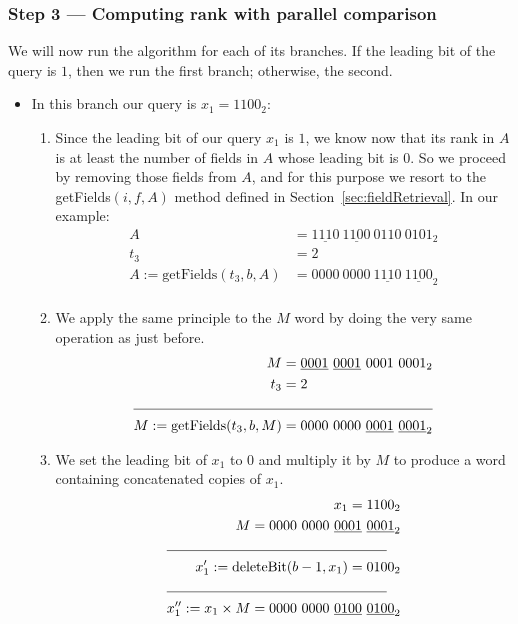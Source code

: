 \subsubsection{Step 3 --- Computing rank with parallel comparison}

We will now run the algorithm for each of its branches. If the leading bit of the query is $1$, then we run the first branch; otherwise, the second.
\begin{itemize}
    \item
    In this branch our query is $x_1 = 1100_2$:
    \begin{enumerate}
        \item
        Since the leading bit of our query $x_1$ is $1$, we know now that its rank in $A$ is at least the number of fields in $A$ whose leading bit is $0$. So we proceed by removing those fields from $A$, and for this purpose we resort to the getFields$(i, f, A)$ method defined in Section~\ref{sec:fieldRetrieval}. In our example:
        \begin{align*}
            A &= \underline{1110}\ \underline{1100}\ 0110\ 0101_2 \\
            t_3 &= 2 \\
            A := \text{getFields}(t_3, b, A) &= 0000\ 0000\ \underline{1110}\ \underline{1100}_2 \\
        \end{align*}
        
        \item
        We apply the same principle to the $M$ word by doing the very same operation as just before.
        \begin{align*}
            M &= \underline{0001}\ \underline{0001}\ 0001\ 0001_2 \\
            t_3 &= 2 \\
            \cline{1-2}
            M := \text{getFields}(t_3, b, M) &= 0000\ 0000\ \underline{0001}\ \underline{0001}_2 \\
        \end{align*}
        
        \item
        We set the leading bit of $x_1$ to $0$ and multiply it by $M$ to produce a word containing concatenated copies of $x_1$.
        \begin{align*}
            x_1 = 1100_2 \\
            M = 0000\ 0000\ \underline{0001}\ \underline{0001}_2 \\
            \cline{1-2}
            x_1' := \text{deleteBit}(b - 1, x_1) = 0100_2 \\
            \cline{1-2}
            x_1'' := x_1 \times M = 0000\ 0000\ \underline{0100}\ \underline{0100}_2 \\
        \end{align*}
        

\end{enumerate}
\end{itemize}
